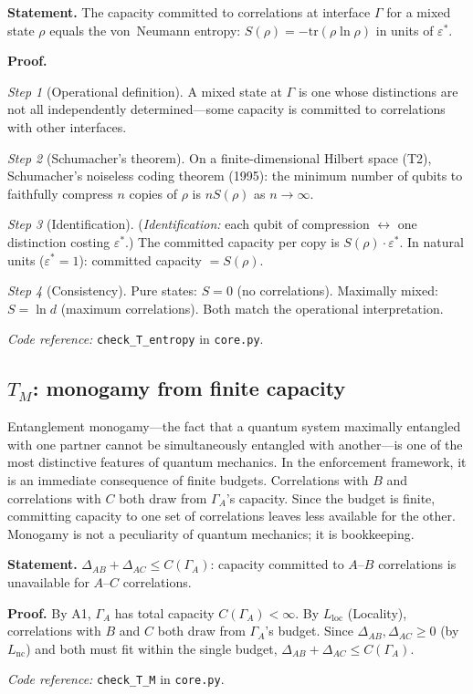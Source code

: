 \documentclass[11pt]{article}
\newcommand{\coderef}[2]{\smallskip\noindent\textit{Code reference:} \texttt{#1} in \texttt{#2}.}
\begin{document}
\begin{tcolorbox}[apfbox, title={$T_{\mathrm{entropy}}$: Von Neumann Entropy as Committed Capacity}]
\textbf{Statement.}  The capacity committed to correlations at interface $\Gamma$ for a mixed state $\rho$ equals the von~Neumann entropy: $S(\rho) = -\mathrm{tr}(\rho \ln \rho)$ in units of $\varepsilon^*$.

\smallskip\noindent\textbf{Proof.}

\textit{Step 1} (Operational definition).  A mixed state at $\Gamma$ is one whose distinctions are not all independently determined---some capacity is committed to correlations with other interfaces.

\textit{Step 2} (Schumacher's theorem).  On a finite-dimensional Hilbert space (T2), Schumacher's noiseless coding theorem (1995): the minimum number of qubits to faithfully compress $n$ copies of $\rho$ is $nS(\rho)$ as $n \to \infty$.

\textit{Step 3} (Identification).  (\textit{Identification:} each qubit of compression $\leftrightarrow$ one distinction costing $\varepsilon^*$.)  The committed capacity per copy is $S(\rho) \cdot \varepsilon^*$.  In natural units ($\varepsilon^* = 1$): committed capacity $= S(\rho)$.

\textit{Step 4} (Consistency).  Pure states: $S = 0$ (no correlations).  Maximally mixed: $S = \ln d$ (maximum correlations).  Both match the operational interpretation.

\coderef{check\_T\_entropy}{core.py}
\end{tcolorbox}


\subsection{\texorpdfstring{$T_M$}{T M}: monogamy from finite capacity}

Entanglement monogamy---the fact that a quantum system maximally entangled with one partner cannot be simultaneously entangled with another---is one of the most distinctive features of quantum mechanics.  In the enforcement framework, it is an immediate consequence of finite budgets.  Correlations with $B$ and correlations with $C$ both draw from $\Gamma_A$'s capacity.  Since the budget is finite, committing capacity to one set of correlations leaves less available for the other.  Monogamy is not a peculiarity of quantum mechanics; it is bookkeeping.

\begin{tcolorbox}[apfbox, title={$T_M$: Interface Monogamy}]
\textbf{Statement.}  $\Delta_{AB} + \Delta_{AC} \le C(\Gamma_A)$: capacity committed to $A$--$B$ correlations is unavailable for $A$--$C$ correlations.

\smallskip\noindent\textbf{Proof.}  By A1, $\Gamma_A$ has total capacity $C(\Gamma_A) < \infty$.  By $L_{\mathrm{loc}}$ (Locality), correlations with $B$ and $C$ both draw from $\Gamma_A$'s budget.  Since $\Delta_{AB}, \Delta_{AC} \ge 0$ (by $L_{\mathrm{nc}}$) and both must fit within the single budget, $\Delta_{AB} + \Delta_{AC} \le C(\Gamma_A)$.

\coderef{check\_T\_M}{core.py}
\end{tcolorbox}
\end{document}
